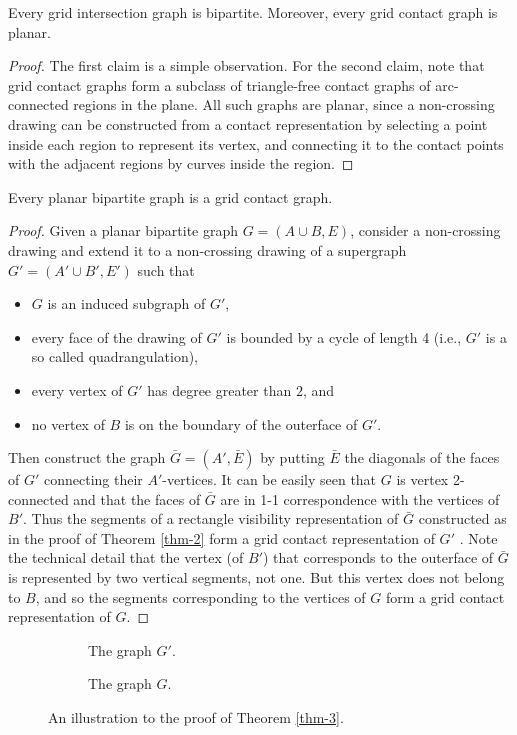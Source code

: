 \begin{prop}
	Every grid intersection graph is bipartite. Moreover, every grid contact graph is planar.
\end{prop}

\begin{proof}
	The first claim is a simple observation. For the second claim, note that grid contact graphs form a subclass of triangle-free contact graphs of arc-connected regions in the plane. All such graphs are planar, since a non-crossing drawing can be constructed from a contact representation by selecting a point inside each region to represent its vertex, and connecting it to the contact points with the adjacent regions by curves inside the region.
\end{proof}

\begin{thm}
	Every planar bipartite graph is a grid contact graph.
	\label{thm-3}
\end{thm}

\begin{proof}
	Given a planar bipartite graph $G = (A \cup B, E)$, consider a non-crossing drawing and extend it to a non-crossing drawing of a supergraph $G' = (A' \cup B' , E')$ such that
	
	\begin{itemize}
		\item $G$ is an induced subgraph of $G'$,
		\item every face of the drawing of $G'$ is bounded by a cycle of length 4 (i.e., $G'$ is a so called quadrangulation),
		\item every vertex of $G'$ has degree greater than $2$, and
		\item no vertex of $B$ is on the boundary of the outerface of $G'$. 
	\end{itemize}
	
	Then construct the graph $\bar{G} = (A', \bar{E})$ by putting $\bar{E}$ the diagonals of the faces of $G'$ connecting their $A'$-vertices. It can be easily seen that $G$ is vertex 2-connected and that the faces of $\bar{G}$ are in 1-1 correspondence with the vertices of $B'$. Thus the segments of a rectangle visibility representation of $\bar{G}$ constructed as in the proof of Theorem \ref{thm-2} form a grid contact representation of $G'$ . Note the technical detail that the vertex (of $B'$) that corresponds to the outerface of $\bar{G}$ is represented by two vertical segments, not one. But this vertex does not belong to $B$, and so the segments corresponding to the vertices of $G$ form a grid contact representation of $G$.
\end{proof}

\begin{figure}[!ht]
	\begin{subfigure}{0.45\textwidth}\centering
		
		\caption{The graph $G'$.}
	\end{subfigure}
	\begin{subfigure}{0.45\textwidth}\centering
		
		\caption{The graph $G$.}
	\end{subfigure}
	\caption{An illustration to the proof of Theorem \ref{thm-3}.}
\end{figure}